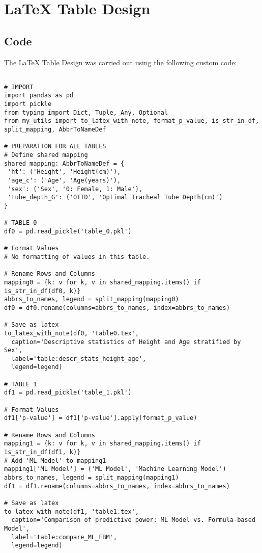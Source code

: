 \documentclass[11pt]{article}
\begin{document}
\section{LaTeX Table Design}
\subsection{{Code}}
The LaTeX Table Design was carried out using the following custom code:

\begin{verbatim}

# IMPORT
import pandas as pd
import pickle
from typing import Dict, Tuple, Any, Optional
from my_utils import to_latex_with_note, format_p_value, is_str_in_df, split_mapping, AbbrToNameDef

# PREPARATION FOR ALL TABLES
# Define shared mapping
shared_mapping: AbbrToNameDef = {
 'ht': ('Height', 'Height(cm)'),
 'age_c': ('Age', 'Age(years)'),
 'sex': ('Sex', '0: Female, 1: Male'),
 'tube_depth_G': ('OTTD', 'Optimal Tracheal Tube Depth(cm)')
}

# TABLE 0
df0 = pd.read_pickle('table_0.pkl')

# Format Values
# No formatting of values in this table.

# Rename Rows and Columns
mapping0 = {k: v for k, v in shared_mapping.items() if is_str_in_df(df0, k)}
abbrs_to_names, legend = split_mapping(mapping0)
df0 = df0.rename(columns=abbrs_to_names, index=abbrs_to_names)

# Save as latex
to_latex_with_note(df0, 'table0.tex',
  caption='Descriptive statistics of Height and Age stratified by Sex',
  label='table:descr_stats_height_age',
  legend=legend)

# TABLE 1
df1 = pd.read_pickle('table_1.pkl')

# Format Values
df1['p-value'] = df1['p-value'].apply(format_p_value)

# Rename Rows and Columns
mapping1 = {k: v for k, v in shared_mapping.items() if is_str_in_df(df1, k)}
# Add 'ML Model' to mapping1
mapping1['ML Model'] = ('ML Model', 'Machine Learning Model') 
abbrs_to_names, legend = split_mapping(mapping1)
df1 = df1.rename(columns=abbrs_to_names, index=abbrs_to_names)

# Save as latex
to_latex_with_note(df1, 'table1.tex',
  caption='Comparison of predictive power: ML Model vs. Formula-based Model',
  label='table:compare_ML_FBM',
  legend=legend)

\end{verbatim}
\end{document}
